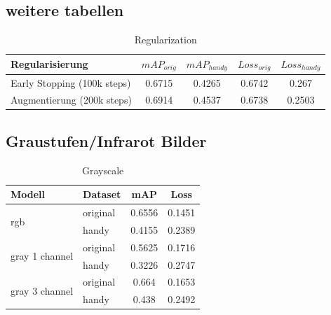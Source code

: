 \subsection{weitere tabellen}\label{subsec:regularisierung}



\begin{table}[htb]
    \centering
    \label{tab:regularization}
    \begin{tabular}{| l || c | c | c | c |} 
        \hline
        Regularisierung & $mAP_{orig}$ & $mAP_{handy}$ & $Loss_{orig}$ &  $Loss_{handy}$\\
        \hline
        Early Stopping (100k steps) & 0.6715 & 0.4265 & 0.6742 & 0.267\\
        \hline
        Augmentierung (200k steps) & 0.6914 & 0.4537 & 0.6738 & 0.2503\\ %
        \hline
    \end{tabular}        
    \caption{Regularization}
\end{table}




\subsection{Graustufen/Infrarot Bilder}\label{subsec:eval_gray}


\begin{table}[htb]
    \centering
    \label{tab:eval_gray}
    \begin{tabular}{| l | l || c | c |} 
        \hline
        Modell & Dataset & mAP & Loss\\
        \hline
        \multirow{2}{*}{rgb} & original & 0.6556 & 0.1451 \\
        & handy & 0.4155 & 0.2389 \\
        \hline
        \multirow{2}{*}{gray 1 channel} & original & 0.5625 & 0.1716 \\
        & handy & 0.3226 & 0.2747 \\
        \hline
        \multirow{2}{*}{gray 3 channel} & original & 0.664 & 0.1653 \\
        & handy & 0.438 & 0.2492 \\
        \hline
    \end{tabular}        
    \caption{Grayscale}
\end{table}


